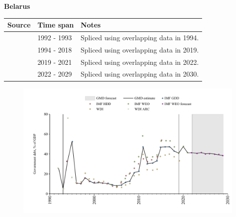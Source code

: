 \documentclass[12pt,a4paper,landscape]{article}
\begin{document}
\begin{adjustbox}{max totalsize={\paperwidth}{\paperheight},center}
\begin{minipage}[t][\textheight][t]{\textwidth}
\vspace*{0.5cm}
{}
\begin{center}
{\Large\bfseries Belarus}
\end{center}
\vspace{0.5cm}
\begin{table}[H]
\centering
\small
\begin{tabular}{|l|l|l|}
\hline
\textbf{Source} & \textbf{Time span} & \textbf{Notes} \\
\hline
\rowcolor{white}\cite{WDI}& 1992 - 1993 &Spliced using overlapping data in 1994.\\
\rowcolor{lightgray}\cite{IMF_GDD}& 1994 - 2018 &Spliced using overlapping data in 2019.\\
\rowcolor{white}\cite{IMF_WEO}& 2019 - 2021 &Spliced using overlapping data in 2022.\\
\rowcolor{lightgray}\cite{IMF_WEO_forecast}& 2022 - 2029 &Spliced using overlapping data in 2030.\\
\hline
\end{tabular}
\end{table}
\begin{figure}[H]
\centering
\includegraphics[width=\textwidth,height=0.6\textheight,keepaspectratio]{graphs/BLR_govdebt_GDP.pdf}
\end{figure}
\end{minipage}
\end{adjustbox}
\end{document}
